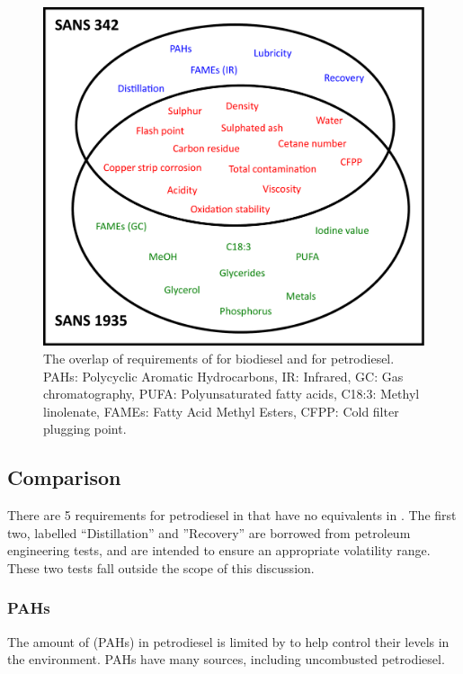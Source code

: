 \begin{figure}
\centering
\includegraphics[width=\textwidth]{Figures/Venn.pdf}
\decoRule

\caption[Overlap of requirements ]{The overlap of requirements of  for biodiesel and  for petrodiesel. PAHs: Polycyclic
Aromatic Hydrocarbons, IR: Infrared, GC: Gas chromatography, PUFA:
Polyunsaturated fatty acids, C18:3: Methyl linolenate, FAMEs: Fatty
Acid Methyl Esters, CFPP: Cold filter plugging point.}

\label{fig:Venn}
\end{figure}

\subsection{Comparison}
There are \num{5} requirements for petrodiesel in  that have no
equivalents in . The first two, labelled ``Distillation'' and
''Recovery'' are borrowed from petroleum engineering tests, and are intended to
ensure an appropriate volatility range. These two tests fall outside the scope
of this discussion.

\subsubsection{PAHs}
The amount of  (PAHs) in petrodiesel
is limited by  to help control their levels in the environment.
PAHs have many sources, including uncombusted petrodiesel.

